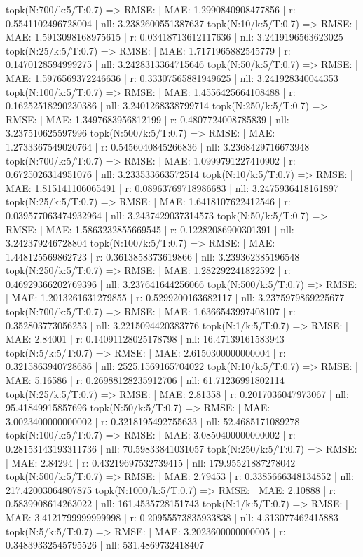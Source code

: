 topk(N:700/k:5/T:0.7) => RMSE: | MAE: 1.2990840908477856 | r: 0.5541102496728004 | nll: 3.2382600551387637
topk(N:10/k:5/T:0.7) => RMSE: | MAE: 1.5913098168975615 | r: 0.03418713612117636 | nll: 3.2419196563623025
topk(N:25/k:5/T:0.7) => RMSE: | MAE: 1.7171965882545779 | r: 0.1470128594999275 | nll: 3.2428313364715646
topk(N:50/k:5/T:0.7) => RMSE: | MAE: 1.5976569372246636 | r: 0.33307565881949625 | nll: 3.241928340044353
topk(N:100/k:5/T:0.7) => RMSE: | MAE: 1.4556425664108488 | r: 0.16252518290230386 | nll: 3.2401268338799714
topk(N:250/k:5/T:0.7) => RMSE: | MAE: 1.3497683956812199 | r: 0.4807724008785839 | nll: 3.237510625597996
topk(N:500/k:5/T:0.7) => RMSE: | MAE: 1.2733367549020764 | r: 0.5456040845266836 | nll: 3.2368429716673948
topk(N:700/k:5/T:0.7) => RMSE: | MAE: 1.0999791227410902 | r: 0.6725026314951076 | nll: 3.233533663572514
topk(N:10/k:5/T:0.7) => RMSE: | MAE: 1.815141106065491 | r: 0.08963769718986683 | nll: 3.2475936418161897
topk(N:25/k:5/T:0.7) => RMSE: | MAE: 1.6418107622412546 | r: 0.039577063474932964 | nll: 3.2437429037314573
topk(N:50/k:5/T:0.7) => RMSE: | MAE: 1.5863232855669545 | r: 0.12282086900301391 | nll: 3.242379246728804
topk(N:100/k:5/T:0.7) => RMSE: | MAE: 1.448125569862723 | r: 0.3613858373619866 | nll: 3.239362385196548
topk(N:250/k:5/T:0.7) => RMSE: | MAE: 1.282292241822592 | r: 0.46929366202769396 | nll: 3.237641644256066
topk(N:500/k:5/T:0.7) => RMSE: | MAE: 1.2013261631279855 | r: 0.5299200163682117 | nll: 3.2375979869225677
topk(N:700/k:5/T:0.7) => RMSE: | MAE: 1.6366543997408107 | r: 0.352803773056253 | nll: 3.2215094420383776
topk(N:1/k:5/T:0.7) => RMSE: | MAE: 2.84001 | r: 0.14091128025178798 | nll: 16.47139161583943
topk(N:5/k:5/T:0.7) => RMSE: | MAE: 2.6150300000000004 | r: 0.3215863940728686 | nll: 2525.1569165704022
topk(N:10/k:5/T:0.7) => RMSE: | MAE: 5.16586 | r: 0.26988128235912706 | nll: 61.71236991802114
topk(N:25/k:5/T:0.7) => RMSE: | MAE: 2.81358 | r: 0.2017036047973067 | nll: 95.41849915857696
topk(N:50/k:5/T:0.7) => RMSE: | MAE: 3.0023400000000002 | r: 0.3218195492755633 | nll: 52.4685171089278
topk(N:100/k:5/T:0.7) => RMSE: | MAE: 3.0850400000000002 | r: 0.28153143193311736 | nll: 70.59833841031057
topk(N:250/k:5/T:0.7) => RMSE: | MAE: 2.84294 | r: 0.43219697532739415 | nll: 179.95521887278042
topk(N:500/k:5/T:0.7) => RMSE: | MAE: 2.79453 | r: 0.3385666348134852 | nll: 217.42003064807875
topk(N:1000/k:5/T:0.7) => RMSE: | MAE: 2.10888 | r: 0.5839908614263022 | nll: 161.4535728151743
topk(N:1/k:5/T:0.7) => RMSE: | MAE: 3.4121799999999998 | r: 0.20955573835933838 | nll: 4.313077462415883
topk(N:5/k:5/T:0.7) => RMSE: | MAE: 3.2023600000000005 | r: 0.34839332545795526 | nll: 531.4869732418407
